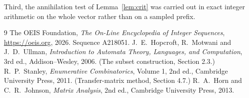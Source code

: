 \documentclass[11pt,a4paper]{article}
\theoremstyle{plain}
\theoremstyle{definition}
\begin{document}
Third, the annihilation test of Lemma~\ref{lem:crit} was carried out in exact integer
arithmetic on the whole vector rather than on a sampled prefix.

\begin{thebibliography}{9}
 The OEIS Foundation, \emph{The On-Line Encyclopedia of Integer
Sequences}, \url{https://oeis.org}, 2026. Sequence A218051.
 J.~E.~Hopcroft, R.~Motwani and J.~D.~Ullman, \emph{Introduction to Automata
Theory, Languages, and Computation}, 3rd ed., Addison--Wesley, 2006. (The subset
construction, Section 2.3.)
 R.~P.~Stanley, \emph{Enumerative Combinatorics}, Volume 1, 2nd ed.,
Cambridge University Press, 2011. (Transfer-matrix method, Section 4.7.)
 R.~A.~Horn and C.~R.~Johnson, \emph{Matrix Analysis}, 2nd ed., Cambridge
University Press, 2013.
\end{thebibliography}
\end{document}
